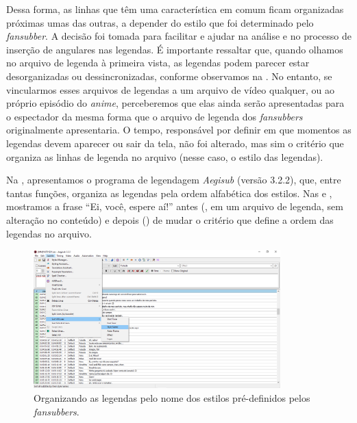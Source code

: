 \documentclass[portuguese]{textolivre}
\begin{document}
Dessa forma, as linhas que têm uma característica em comum ficam organizadas próximas umas das outras, a depender do estilo que foi determinado pelo \textit{fansubber}. A decisão foi tomada para facilitar e ajudar na análise e no processo de inserção de angulares nas legendas. É importante ressaltar que, quando olhamos no arquivo de legenda à primeira vista, as legendas podem parecer estar desorganizadas ou dessincronizadas, conforme observamos na . No entanto, se vincularmos esses arquivos de legendas a um arquivo de vídeo qualquer, ou ao próprio episódio do \textit{anime}, perceberemos que elas ainda serão apresentadas para o espectador da mesma forma que o arquivo de legenda dos \textit{fansubbers} originalmente apresentaria. O tempo, responsável por definir em que momentos as legendas devem aparecer ou sair da tela, não foi alterado, mas sim o critério que organiza as linhas de legenda no arquivo (nesse caso, o estilo das legendas).

Na , apresentamos o programa de legendagem \textit{Aegisub} (versão 3.2.2), que, entre tantas funções, organiza as legendas pela ordem alfabética dos estilos. Nas  e , mostramos a frase “Ei, você, espere aí!” antes (, em um arquivo de legenda, sem alteração no conteúdo) e depois () de mudar o critério que define a ordem das legendas no arquivo. 

\begin{figure}[htbp]
 \centering
 \includegraphics[width=0.85\textwidth]{Fig13.png}
 \caption{Organizando as legendas pelo nome dos estilos pré-definidos pelos \textit{fansubbers}.}
 \label{fig13}
\end{figure}
\end{document}
